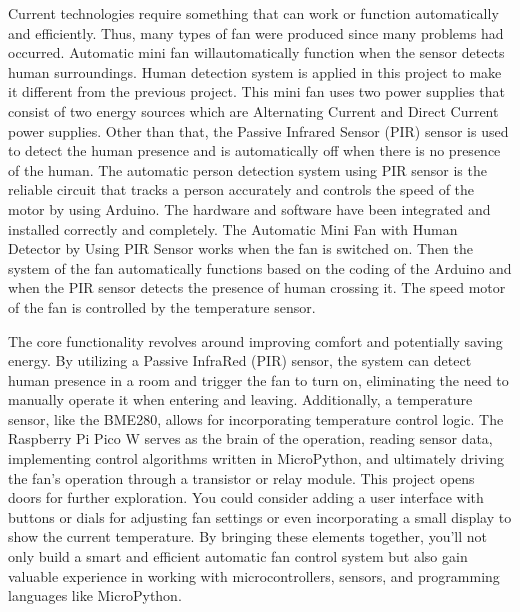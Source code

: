 \documentclass[12pt]{report}
\begin{document}
		Current technologies require something that can work or function automatically and efficiently. Thus, many types of fan were produced since many problems had occurred. Automatic mini fan willautomatically function when the sensor detects human surroundings. Human detection system is applied in this project to make it different from the previous project. This mini fan uses two power supplies that consist of two energy sources which are Alternating Current and Direct Current power supplies. Other than that, the Passive Infrared Sensor (PIR) sensor is used to detect the human presence and is automatically off when there is no presence of the human. The automatic person detection system using PIR sensor is the reliable circuit that tracks a person accurately and controls the speed of the motor by using Arduino. The hardware and software have been integrated and installed correctly and completely. The Automatic Mini Fan with Human Detector by Using PIR Sensor works when the fan is switched on. Then the system of the fan automatically functions based on the coding of the Arduino and when the PIR sensor detects the presence of human crossing it. The speed motor of the fan is controlled by the temperature sensor.
		
		The core functionality revolves around improving comfort and potentially saving energy. By utilizing a Passive InfraRed (PIR) sensor, the system can detect human presence in a room and trigger the fan to turn on, eliminating the need to manually operate it when entering and leaving. Additionally, a temperature sensor, like the BME280, allows for incorporating temperature control logic. The Raspberry Pi Pico W serves as the brain of the operation, reading sensor data, implementing control algorithms written in MicroPython, and ultimately driving the fan's operation through a transistor or relay module. This project opens doors for further exploration. You could consider adding a user interface with buttons or dials for adjusting fan settings or even incorporating a small display to show the current temperature. By bringing these elements together, you'll not only build a smart and efficient automatic fan control system but also gain valuable experience in working with microcontrollers, sensors, and programming languages like MicroPython.
		
\end{document}
